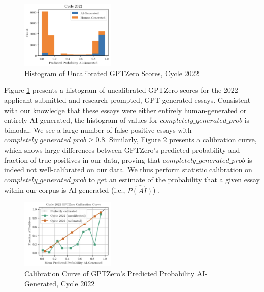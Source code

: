 \begin{figure}[tbh]
    \centering
    \includegraphics[width=0.4\textwidth]{figures/generative_ai/hist.png}
    \caption{Histogram of Uncalibrated GPTZero Scores, Cycle 2022}
    \label{fig:c2_hist}
\end{figure}

Figure \ref{fig:c2_hist} presents a histogram of uncalibrated GPTZero scores for the 2022 applicant-submitted and research-prompted, GPT-generated essays. Consistent with our knowledge that these essays were either entirely human-generated or entirely AI-generated, the histogram of values for $completely\_generated\_prob$ is bimodal. We see a large number of false positive essays with $completely\_generated\_prob \geq 0.8$. Similarly, Figure \ref{fig:c2_calibration} presents a calibration curve, which shows large differences between GPTZero's predicted probability and fraction of true positives in our data, proving that $completely\_generated\_prob$ is indeed not well-calibrated on our data. We thus perform statistic calibration on $completely\_generated\_prob$ to get an estimate of the probability that a given essay within our corpus is AI-generated (i.e., $\widehat{P(AI)}$) \cite{Niculescu-Mizil_Caruana_2005}.

\begin{figure}[tbh]
    \centering
    \includegraphics[width=0.4\textwidth]{figures/generative_ai/calibration.png}
    \caption{Calibration Curve of GPTZero's Predicted Probability AI-Generated, Cycle 2022}
    \label{fig:c2_calibration}
\end{figure}

